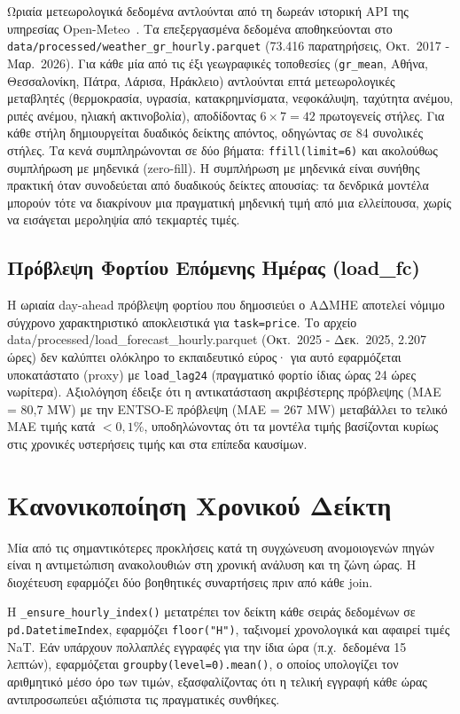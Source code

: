 Ωριαία μετεωρολογικά δεδομένα αντλούνται από τη δωρεάν ιστορική API της υπηρεσίας
Open-Meteo~\cite{openmeteo}. Τα επεξεργασμένα δεδομένα αποθηκεύονται στο
\texttt{data/processed/weather\_gr\_hourly.parquet} (73.416 παρατηρήσεις,
Οκτ.\ 2017 - Μαρ.\ 2026). Για κάθε μία από τις έξι γεωγραφικές τοποθεσίες
(\texttt{gr\_mean}, Αθήνα, Θεσσαλονίκη, Πάτρα, Λάρισα, Ηράκλειο) αντλούνται επτά
μετεωρολογικές μεταβλητές (θερμοκρασία, υγρασία, κατακρημνίσματα, νεφοκάλυψη, ταχύτητα
ανέμου, ριπές ανέμου, ηλιακή ακτινοβολία), αποδίδοντας $6 \times 7 = 42$ πρωτογενείς στήλες.
Για κάθε στήλη δημιουργείται δυαδικός δείκτης απόντος, οδηγώντας σε 84 συνολικές στήλες.
Τα κενά συμπληρώνονται σε δύο βήματα: \texttt{ffill(limit=6)} και ακολούθως συμπλήρωση με μηδενικά (zero-fill). Η συμπλήρωση με μηδενικά είναι συνήθης πρακτική όταν συνοδεύεται από δυαδικούς δείκτες απουσίας: τα δενδρικά μοντέλα μπορούν τότε να διακρίνουν μια πραγματική μηδενική τιμή από μια ελλείπουσα, χωρίς να εισάγεται μεροληψία από τεκμαρτές τιμές.


\subsection{Πρόβλεψη Φορτίου Επόμενης Ημέρας (load\_fc)}

Η ωριαία day-ahead πρόβλεψη φορτίου που δημοσιεύει ο ΑΔΜΗΕ αποτελεί νόμιμο σύγχρονο
χαρακτηριστικό αποκλειστικά για \texttt{task=price}. Το αρχείο
{data/processed/load\_forecast\_hourly.parquet} (Οκτ.\ 2025 - Δεκ.\ 2025, 2.207 ώρες)
δεν καλύπτει ολόκληρο το εκπαιδευτικό εύρος· για αυτό εφαρμόζεται υποκατάστατο (proxy) με \texttt{load\_lag24} (πραγματικό φορτίο ίδιας ώρας 24 ώρες νωρίτερα). Αξιολόγηση έδειξε
ότι η αντικατάσταση ακριβέστερης πρόβλεψης (MAE = 80,7 MW) με την ENTSO-E πρόβλεψη
(MAE = 267 MW) μεταβάλλει το τελικό MAE τιμής κατά $<0{,}1\%$, υποδηλώνοντας ότι τα
μοντέλα τιμής βασίζονται κυρίως στις χρονικές υστερήσεις τιμής και στα επίπεδα καυσίμων.


\section{Κανονικοποίηση Χρονικού Δείκτη}
\label{sec:time_normalization}

Μία από τις σημαντικότερες προκλήσεις κατά τη συγχώνευση ανομοιογενών πηγών είναι η
αντιμετώπιση ανακολουθιών στη χρονική ανάλυση και τη ζώνη ώρας. Η διοχέτευση εφαρμόζει δύο
βοηθητικές συναρτήσεις πριν από κάθε join.

Η \texttt{\_ensure\_hourly\_index()} μετατρέπει τον δείκτη κάθε σειράς δεδομένων σε
\texttt{pd.DatetimeIndex}, εφαρμόζει \texttt{floor("H")}, ταξινομεί χρονολογικά και αφαιρεί
τιμές NaT. Εάν υπάρχουν πολλαπλές εγγραφές για την ίδια ώρα (π.χ.\ δεδομένα 15 λεπτών),
εφαρμόζεται \texttt{groupby(level=0).mean()}, ο οποίος υπολογίζει τον αριθμητικό μέσο όρο
των τιμών, εξασφαλίζοντας ότι η τελική εγγραφή κάθε ώρας αντιπροσωπεύει αξιόπιστα τις
πραγματικές συνθήκες.

